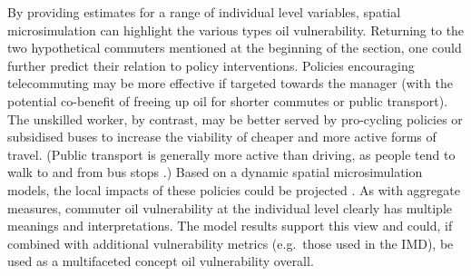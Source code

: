 \documentclass[a4paper, 11pt, twoside]{Thesis}
\begin{document}
By providing estimates for a range of individual level variables, spatial
microsimulation can highlight the various types oil vulnerability.
Returning to the two hypothetical commuters mentioned at the beginning of
the section, one could further predict their relation to policy interventions.
Policies encouraging telecommuting
may be more effective if targeted towards the manager (with the potential
co-benefit of freeing up oil for shorter commutes or public transport). The
unskilled worker, by contrast, may be better served by pro-cycling policies
or subsidised buses to
increase the viability of cheaper and more active forms of
travel. (Public transport is generally more active than driving, as people
tend to walk to and from bus stops \citep{Besser2005-active}.)
Based on a dynamic spatial microsimulation models, the local impacts of these
policies could be projected \citep{Ballas2005-ireland}. As with
aggregate measures, commuter oil vulnerability at the individual level clearly
has
multiple meanings and interpretations.
The model results support this view and could, if combined with additional
vulnerability metrics (e.g.~those used in the IMD),
be used as a multifaceted concept oil vulnerability overall.
\end{document}
